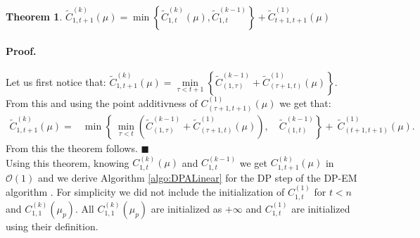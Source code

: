 \documentclass[11pt]{llncs}
\newtheorem{theo}{Theorem}[section]    %
\begin{document}

\begin{theo}
$ \widetilde{C}_{1, t+1}^{(k)}(\mu) = \min \left\{ \widetilde{C}_{1, t}^{(k)}(\mu),  \widetilde{C}_{1, t}^{(k-1)} \right\} +  \widetilde{C}_{t+1, t+1}^{(1)}(\mu) $
\end{theo}

\paragraph{Proof. } Let us first notice that: 
$ \widetilde{C}_{1, t+1}^{(k)}(\mu) =  \underset{{\tau < t+1} }{\min}\left\{  \widetilde{C}_{(1,\tau)}^{(k-1)}  +  \widetilde{C}_{(\tau+1, t)}^{(1)}(\mu) \right\}
.$
From this and using the point additivness of $ C_{(\tau+1, t+1)}^{(1)}(\mu)$ we get that:
\begin{eqnarray*}
 \widetilde{C}_{1, t+1}^{(k)}(\mu) = & \min \left\{ \ \underset{{\tau < t}}{\min} \left(  \widetilde{C}_{(1,\tau)}^{(k-1)}  +  \widetilde{C}_{(\tau+1, t)}^{(1)}(\mu) \right), \quad  \widetilde{C}_{(1,t)}^{(k-1)}  \right\} +  \ \widetilde{C}_{(t+1, t+1)}^{(1)}(\mu).
\end{eqnarray*}
\noindent From this the theorem follows. $\blacksquare$ \\

Using this theorem, knowing $C_{1, t}^{(k)}(\mu)$ and $C_{1, t}^{(k-1)}$ we get $C_{1, t+1}^{(k)}(\mu)$ in $\mathcal{O}(1)$
and we derive Algorithm \ref{algo:DPALinear} for the DP step of the DP-EM algorithm \cite{picard_2007}. For simplicity we did not include the initialization of $C^{(1)}_{1,t}$ for $t < n$ and $C^{(k)}_{1,1}(\mu_p)$.
All $C^{(k)}_{1,1}(\mu_p)$ are initialized as $+\infty$ and $C^{(1)}_{1,t}$ are initialized using their definition.
\end{document}
